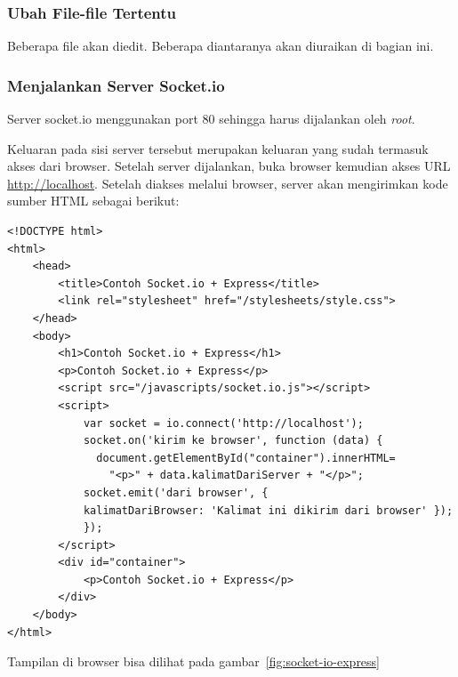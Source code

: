 \subsubsection{Ubah File-file Tertentu}

Beberapa file akan diedit. Beberapa diantaranya akan diuraikan di bagian ini.

\lstset{language=JavaScript,caption=app.js}


\lstset{language=html,caption=views/index.jade}


\lstset{language=html,caption=routes/index.js}


\subsubsection{Menjalankan Server Socket.io}

Server socket.io menggunakan port 80 sehingga harus dijalankan oleh \textit{root}. 

\lstset{language=Bash,caption=Menjalankan server Socket.io}


Keluaran pada sisi server tersebut merupakan keluaran yang sudah termasuk akses dari browser. Setelah server dijalankan, buka browser kemudian akses URL \url{http://localhost}. Setelah diakses melalui browser, server akan mengirimkan kode sumber HTML sebagai berikut:

\lstset{language=html,caption=Kode sumber di browser}
\begin{lstlisting}
<!DOCTYPE html>
<html>
	<head>
		<title>Contoh Socket.io + Express</title>
		<link rel="stylesheet" href="/stylesheets/style.css">
	</head>
	<body>
		<h1>Contoh Socket.io + Express</h1>
		<p>Contoh Socket.io + Express</p>
		<script src="/javascripts/socket.io.js"></script>
		<script>
			var socket = io.connect('http://localhost');
			socket.on('kirim ke browser', function (data) {
			  document.getElementById("container").innerHTML=
			    "<p>" + data.kalimatDariServer + "</p>";
			socket.emit('dari browser', { 
		    kalimatDariBrowser: 'Kalimat ini dikirim dari browser' });
			});
		</script>
		<div id="container">
			<p>Contoh Socket.io + Express</p>
		</div>
	</body>
</html>
\end{lstlisting}

Tampilan di browser bisa dilihat pada gambar~\ref{fig:socket-io-express}

